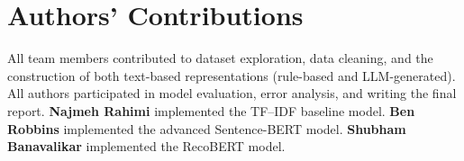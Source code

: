 \documentclass[11pt]{article}
\begin{document}
\section*{Authors' Contributions}

All team members contributed to dataset exploration, data cleaning, and the construction of both text-based representations (rule-based and LLM-generated). All authors participated in model evaluation, error analysis, and writing the final report.
\textbf{Najmeh Rahimi} implemented the TF--IDF baseline model.
\textbf{Ben Robbins} implemented the advanced Sentence-BERT model.
\textbf{Shubham Banavalikar} implemented the RecoBERT model.



\end{document}
